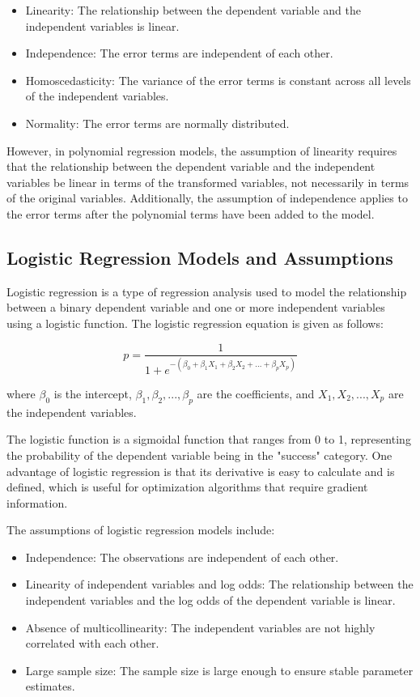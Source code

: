 \documentclass{article}
\begin{document}
\begin{itemize}
\item Linearity: The relationship between the dependent variable and the independent variables is linear.
\item Independence: The error terms are independent of each other.
\item Homoscedasticity: The variance of the error terms is constant across all levels of the independent variables.
\item Normality: The error terms are normally distributed.
\end{itemize}

However, in polynomial regression models, the assumption of linearity requires that the relationship between the dependent variable and the independent variables be linear in terms of the transformed variables, not necessarily in terms of the original variables. Additionally, the assumption of independence applies to the error terms after the polynomial terms have been added to the model.


\subsection{Logistic Regression Models and Assumptions}
Logistic regression is a type of regression analysis used to model the relationship between a binary dependent variable and one or more independent variables using a logistic function. The logistic regression equation is given as follows:

\begin{equation}
p = \frac{1}{1 + e^{-(\beta_0 + \beta_1X_1 + \beta_2X_2 + ... + \beta_pX_p)}}
\end{equation}

where $\beta_0$ is the intercept, $\beta_1, \beta_2, ..., \beta_p$ are the coefficients, and $X_1, X_2, ..., X_p$ are the independent variables.

The logistic function is a sigmoidal function that ranges from 0 to 1, representing the probability of the dependent variable being in the "success" category. One advantage of logistic regression is that its derivative is easy to calculate and is defined, which is useful for optimization algorithms that require gradient information.

The assumptions of logistic regression models include:

\begin{itemize}
\item Independence: The observations are independent of each other.
\item Linearity of independent variables and log odds: The relationship between the independent variables and the log odds of the dependent variable is linear.
\item Absence of multicollinearity: The independent variables are not highly correlated with each other.
\item Large sample size: The sample size is large enough to ensure stable parameter estimates.
\end{itemize}
\end{document}
